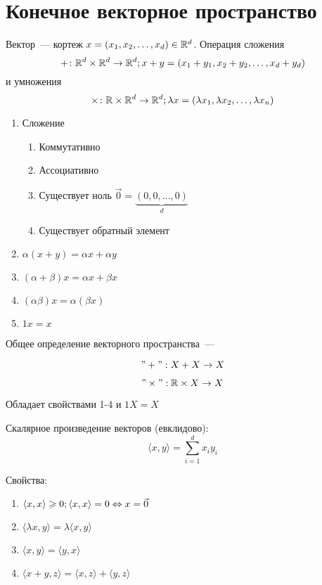 \section{Конечное векторное пространство}

\begin{Def}
Вектор~--- кортеж $x = (x_1, x_2, \ldots, x_d) \in \mathbb{R}^d$. Операция сложения 
$$+\colon \mathbb{R}^d \times \mathbb{R}^d \rightarrow \mathbb{R}^d;x+y = (x_1+y_1, x_2+y_2, \ldots, x_d + y_d)$$ 
и умножения 
$$\times\colon \mathbb{R} \times \mathbb{R}^d \rightarrow \mathbb{R}^d; \lambda x = (\lambda x_1, \lambda x_2, \ldots, \lambda x_n)$$
\end{Def}
\begin{enumerate}
\item Сложение
\begin{enumerate}
\item Коммутативно
\item Ассоциативно
\item Существует ноль $\vec 0 = \underbrace{(0, 0, \ldots, 0)}_d$
\item Существует обратный элемент
\end{enumerate}
\item $\alpha (x + y) = \alpha x + \alpha y$
\item $(\alpha + \beta) x = \alpha x + \beta x$
\item $(\alpha\beta)x = \alpha(\beta x)$
\item $1x = x$
\end{enumerate}
\begin{Def}
Общее определение векторного пространства~--- 

$$"+": X + X \to X$$

$$"\times": \mathbb{R} \times X \to X$$

Обладает свойствами 1-4 и $1X = X$ 
\end{Def}

\begin{Def}
Скалярное произведение векторов (евклидово):
$$\langle x, y\rangle = \sum_{i=1}^d x_iy_i$$
\end{Def}
Свойства:~%
\begin{enumerate}
\item $\langle x, x\rangle \geqslant 0; \langle x, x\rangle = 0 \Leftrightarrow x = \vec 0$
\item $\langle \lambda x, y\rangle = \lambda \langle x, y\rangle$
\item $\langle x, y\rangle = \langle y, x\rangle$
\item $\langle x + y, z\rangle = \langle x, z\rangle + \langle y, z\rangle$
\end{enumerate}

